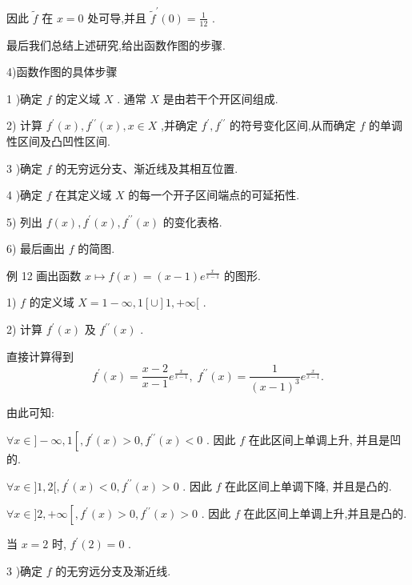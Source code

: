 因此 $\widetilde{f}$ 在 $x = 0$ 处可导,并且 ${\widetilde{f}}^{\prime }\left( 0\right)  = \frac{1}{12}$ .

最后我们总结上述研究,给出函数作图的步骤.

4)函数作图的具体步骤

1 )确定 $f$ 的定义域 $X$ . 通常 $X$ 是由若干个开区间组成.

2) 计算 ${f}^{\prime }\left( x\right) ,{f}^{\prime \prime }\left( x\right) ,x \in  X$ ,并确定 ${f}^{\prime },{f}^{\prime \prime }$ 的符号变化区间,从而确定 $f$ 的单调性区间及凸凹性区间.

3 )确定 $f$ 的无穷远分支、渐近线及其相互位置.

4 )确定 $f$ 在其定义域 $X$ 的每一个开子区间端点的可延拓性.

5) 列出 $f\left( x\right) ,{f}^{\prime }\left( x\right) ,{f}^{\prime \prime }\left( x\right)$ 的变化表格.

6) 最后画出 $f$ 的简图.

例 12 画出函数 $x \mapsto  f\left( x\right)  = \left( {x - 1}\right) {e}^{\frac{x}{x - 1}}$ 的图形.

1) $f$ 的定义域 $X = 1 - \infty ,1\left\lbrack  \cup \right\rbrack  1, + \infty \lbrack$ .

2) 计算 ${f}^{\prime }\left( x\right)$ 及 ${f}^{\prime \prime }\left( x\right)$ .

直接计算得到
$${f}^{\prime }\left( x\right)  = \frac{x - 2}{x - 1}{e}^{\frac{x}{x - 1}},\;{f}^{\prime \prime }\left( x\right)  = \frac{1}{{\left( x - 1\right) }^{3}}{e}^{\frac{x}{x - 1}}.$$

由此可知:

$\forall x \in  \rbrack  - \infty ,1\left\lbrack  {,{f}^{\prime }\left( x\right)  > 0,{f}^{\prime \prime }\left( x\right)  < 0}\right.$ . 因此 $f$ 在此区间上单调上升, 并且是凹的.

$\forall x \in  \rbrack 1,2\lbrack ,{f}^{\prime }\left( x\right)  < 0,{f}^{\prime \prime }\left( x\right)  > 0$ . 因此 $f$ 在此区间上单调下降, 并且是凸的.

$\forall x \in  \rbrack 2, + \infty \left\lbrack  {,{f}^{\prime }\left( x\right)  > 0,{f}^{\prime \prime }\left( x\right)  > 0}\right.$ . 因此 $f$ 在此区间上单调上升,并且是凸的.

当 $x = 2$ 时, ${f}^{\prime }\left( 2\right)  = 0$ .

3 )确定 $f$ 的无穷远分支及渐近线.

